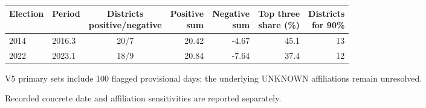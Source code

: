 \begin{tabular}{llcrrrr}
\toprule
Election & Period &
\shortstack{Districts\\positive/negative} &
\shortstack{Positive\\sum} &
\shortstack{Negative\\sum} &
\shortstack{Top three\\share (\%)} &
\shortstack{Districts\\for 90\%} \\ 
\midrule
2014 & 2016.3 & 20/7 & 20.42 & -4.67 & 45.1 & 13 \\
2022 & 2023.1 & 18/9 & 20.84 & -7.64 & 37.4 & 12 \\
\bottomrule
\end{tabular}

\par{\footnotesize V5 primary sets include 100 flagged provisional days; the underlying UNKNOWN affiliations remain unresolved.}\par{\footnotesize Recorded concrete date and affiliation sensitivities are reported separately.}
